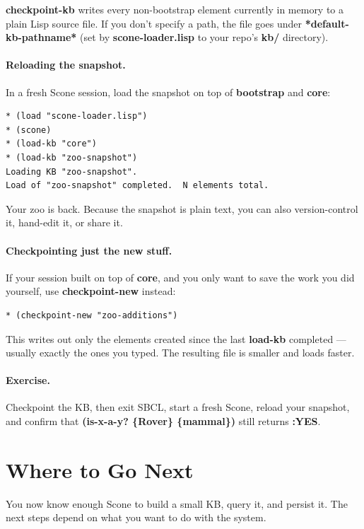 \documentclass[titlepage,twoside,openright,11pt]{article}
\begin{document}
\textbf{checkpoint-kb} writes every non-bootstrap element currently
in memory to a plain Lisp source file. If you don't specify a path,
the file goes under \textbf{*default-kb-pathname*} (set by
\textbf{scone-loader.lisp} to your repo's \textbf{kb/} directory).

\paragraph{Reloading the snapshot.}
In a fresh Scone session, load the snapshot on top of
\textbf{bootstrap} and \textbf{core}:

\begin{verbatim}
* (load "scone-loader.lisp")
* (scone)
* (load-kb "core")
* (load-kb "zoo-snapshot")
Loading KB "zoo-snapshot".
Load of "zoo-snapshot" completed.  N elements total.
\end{verbatim}

Your zoo is back. Because the snapshot is plain text, you can also
version-control it, hand-edit it, or share it.

\paragraph{Checkpointing just the new stuff.}
If your session built on top of \textbf{core}, and you only want to
save the work you did yourself, use \textbf{checkpoint-new}
instead:

\begin{verbatim}
* (checkpoint-new "zoo-additions")
\end{verbatim}

This writes out only the elements created since the last
\textbf{load-kb} completed --- usually exactly the ones you typed.
The resulting file is smaller and loads faster.

\paragraph{Exercise.}
Checkpoint the KB, then exit SBCL, start a fresh Scone, reload
your snapshot, and confirm that \textbf{(is-x-a-y? \{Rover\}
\{mammal\})} still returns \textbf{:YES}.

\section{Where to Go Next}\label{where-to-go-next}

You now know enough Scone to build a small KB, query it, and
persist it. The next steps depend on what you want to do with the
system.
\end{document}
